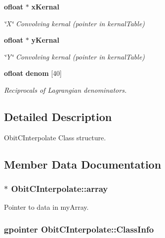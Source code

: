 \begin{CompactItemize}
{\bf ofloat} $\ast$ {\bf x\-Kernal}
\begin{CompactList}\small\item\em \char`\"{}X\char`\"{} Convolving kernal (pointer in kernal\-Table) \item\end{CompactList}\item 
{\bf ofloat} $\ast$ {\bf y\-Kernal}
\begin{CompactList}\small\item\em \char`\"{}Y\char`\"{} Convolving kernal (pointer in kernal\-Table) \item\end{CompactList}\item 
{\bf ofloat} {\bf denom} [40]
\begin{CompactList}\small\item\em Reciprocals of Lagrangian denominators. \item\end{CompactList}\end{CompactItemize}


\subsection{Detailed Description}
Obit\-CInterpolate Class structure. 



\subsection{Member Data Documentation}
\subsubsection{$\ast$ {\bf Obit\-CInterpolate::array}}\label{structObitCInterpolate_o8}


Pointer to data in my\-Array. 

\subsubsection{\setlength{\rightskip}{0pt plus 5cm}gpointer {\bf Obit\-CInterpolate::Class\-Info}}\label{structObitCInterpolate_o1}


